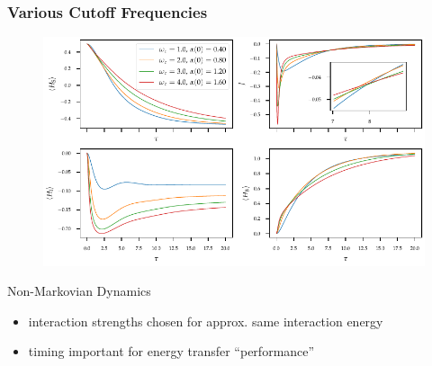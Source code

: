 \documentclass[10pt, aspectratio=169]{beamer}
\begin{document}
\begin{frame}
  \frametitle{Various Cutoff Frequencies}
  \begin{figure}[h]
    \centering
    \includegraphics[height=.9\textheight]{figs/one_bath_syst/omega_energy_overview}
  \end{figure}
\end{frame}

\begin{frame}{Non-Markovian Dynamics}
  \begin{figure}[h]
    \centering
  \end{figure}
  \begin{itemize}
  \item<+-> interaction strengths chosen for approx. same interaction
    energy
  \item<+-> timing important for energy transfer ``performance''
  \end{itemize}
\end{frame}
\end{document}
